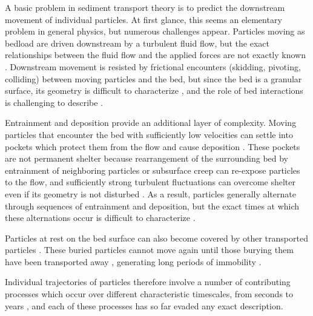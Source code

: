 A basic problem in sediment transport theory is to predict the downstream movement of individual particles.
At first glance, this seems an elementary problem in general physics, but numerous challenges appear.
Particles moving as bedload are driven downstream by a turbulent fluid flow, but the exact relationships between the fluid flow and the applied forces are not exactly known \citep{Maxey1983,Schmeeckle2007}.
Downstream movement is resisted by frictional encounters (skidding, pivoting, colliding) between moving particles and the bed, but since the bed is a granular surface, its geometry is difficult to characterize \citep{Gordon1972}, and the role of bed interactions is challenging to describe \citep{Sekine1992, Nino1998}.

Entrainment and deposition provide an additional layer of complexity.
Moving particles that encounter the bed with sufficiently low velocities can settle into pockets which protect them from the flow \citep{Miller1966} and cause deposition \citep{Charru2004}.
These pockets are not permanent shelter because rearrangement of the surrounding bed by entrainment of neighboring particles or subsurface creep \citep{Houssais2016,Frey2014} can re-expose particles to the flow, and sufficiently strong turbulent fluctuations \citep{Cameron2020} can overcome shelter even if its geometry is not disturbed \citep{Valyrakis2010,Celik2014}. 
As a result, particles generally alternate through sequences of entrainment and deposition, but the exact times at which these alternations occur is difficult to characterize \citep{Einstein1937}.

Particles at rest on the bed surface can also become covered by other transported particles \citep{Yang1971}. 
These buried particles cannot move again until those burying them have been transported away \citep{Nakagawa1981}, generating long periods of immobility \citep{Hassan1994,Ferguson2002}.

Individual trajectories of particles therefore involve a number of contributing processes which occur over different characteristic timescales, from seconds to years \citep{Pretzlav2021}, and each of these processes has so far evaded any exact description.

